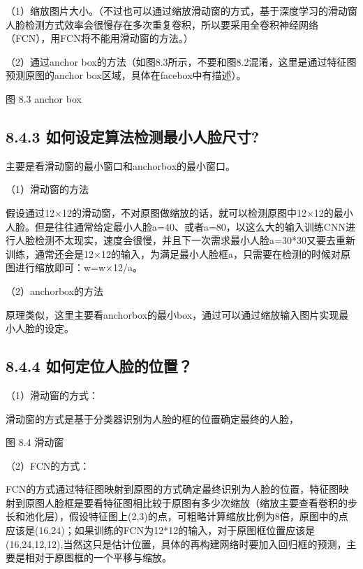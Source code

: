 （1）缩放图片大小。（不过也可以通过缩放滑动窗的方式，基于深度学习的滑动窗人脸检测方式效率会很慢存在多次重复卷积，所以要采用全卷积神经网络（FCN），用FCN将不能用滑动窗的方法。）

（2）通过anchor
box的方法（如图8.3所示，不要和图8.2混淆，这里是通过特征图预测原图的anchor
box区域，具体在facebox中有描述）。

\begin{figure}
\centering
\caption{}
\end{figure}

图 8.3 anchor box

\subsection{8.4.3
如何设定算法检测最小人脸尺寸?}\label{ux5982ux4f55ux8bbeux5b9aux7b97ux6cd5ux68c0ux6d4bux6700ux5c0fux4ebaux8138ux5c3aux5bf8}

主要是看滑动窗的最小窗口和anchorbox的最小窗口。

（1）滑动窗的方法

假设通过12×12的滑动窗，不对原图做缩放的话，就可以检测原图中12×12的最小人脸。但是往往通常给定最小人脸a=40、或者a=80，以这么大的输入训练CNN进行人脸检测不太现实，速度会很慢，并且下一次需求最小人脸a=30*30又要去重新训练，通常还会是12×12的输入，为满足最小人脸框a，只需要在检测的时候对原图进行缩放即可：w=w×12/a。

（2）anchorbox的方法

原理类似，这里主要看anchorbox的最小box，通过可以通过缩放输入图片实现最小人脸的设定。

\subsection{8.4.4
如何定位人脸的位置？}\label{ux5982ux4f55ux5b9aux4f4dux4ebaux8138ux7684ux4f4dux7f6e}

（1）滑动窗的方式：

滑动窗的方式是基于分类器识别为人脸的框的位置确定最终的人脸，

\begin{figure}
\centering
\caption{}
\end{figure}

图 8.4 滑动窗

（2）FCN的方式：

​
FCN的方式通过特征图映射到原图的方式确定最终识别为人脸的位置，特征图映射到原图人脸框是要看特征图相比较于原图有多少次缩放（缩放主要查看卷积的步长和池化层），假设特征图上(2,3)的点，可粗略计算缩放比例为8倍，原图中的点应该是(16,24)；如果训练的FCN为12*12的输入，对于原图框位置应该是(16,24,12,12),当然这只是估计位置，具体的再构建网络时要加入回归框的预测，主要是相对于原图框的一个平移与缩放。

